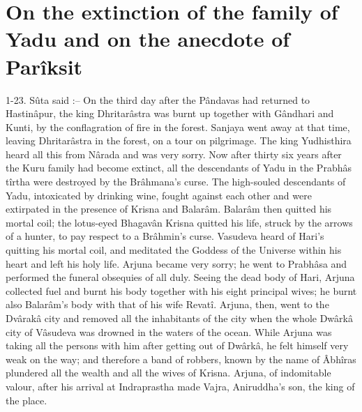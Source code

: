 ﻿\chapter{On the extinction of the family of Yadu and on the anecdote of Par\^iksit}

1-23. S\^uta said :-- On the third day after the P\^andavas had returned to Hastin\^apur, the king Dhritar\^astra was burnt up together with G\^andhari and Kunti, by the conflagration of fire in the forest. Sanjaya went away at that time, leaving Dhritar\^astra in the forest, on a tour on pilgrimage. The king Yudhisthira heard all this from N\^arada and was very sorry. Now after thirty six years after the Kuru family had become extinct, all the descendants of Yadu in the Prabh\^as t\^irtha were destroyed by the Br\^ahmana's curse. The high-souled descendants of Yadu, intoxicated by drinking wine, fought against each other and were extirpated in the presence of Krisna and Balar\^am. Balar\^am then quitted his mortal coil; the lotus-eyed Bhagav\^an Krisna quitted his life, struck by the arrows of a hunter, to pay respect to a Br\^ahmin's curse. Vasudeva heard of Hari's quitting his mortal coil, and meditated the Goddess of the Universe within his heart and left his holy life. Arjuna became very sorry; he went to Prabh\^asa and performed the funeral obsequies of all duly. Seeing the dead body of Hari, Arjuna collected fuel and burnt his body together with his eight principal wives; he burnt also Balar\^am's body with that of his wife Revat\^i. Arjuna, then, went to the Dv\^arak\^a city and removed all the inhabitants of the city when the whole Dw\^ark\^a city of V\^asudeva was drowned in the waters of the ocean. While Arjuna was taking all the persons with him after getting out of Dw\^ark\^a, he felt himself very weak on the way; and therefore a band of robbers, known by the name of Âbh\^iras plundered all the wealth and all the wives of Krisna. Arjuna, of indomitable valour, after his arrival at Indraprastha made Vajra, Aniruddha's son, the king of the place.

